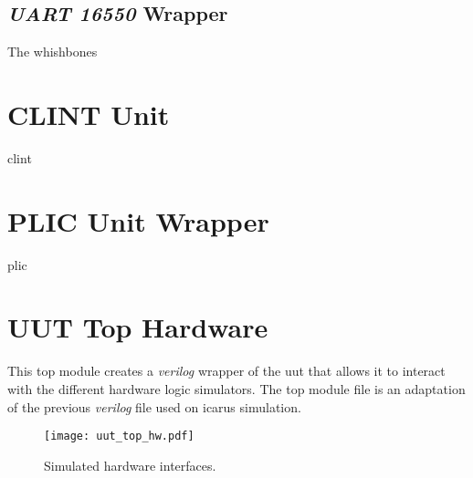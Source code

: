 \subsection{\textit{UART 16550} Wrapper}
The whishbones

\section{CLINT Unit}
\acrshort{clint}

\section{PLIC Unit Wrapper}
\acrshort{plic} 

\section{UUT Top Hardware}
This top module creates a \textit{verilog} wrapper of the \acrfull{uut} that allows it to interact with the different hardware logic simulators. The top module file is an adaptation of the previous \textit{verilog} file used on icarus simulation.

\begin{figure}[!ht]
    \centering
    \texttt{[image: uut\_top\_hw.pdf]}
    \caption{Simulated hardware interfaces.}
    \label{fig:uut_top_hw}
\end{figure}